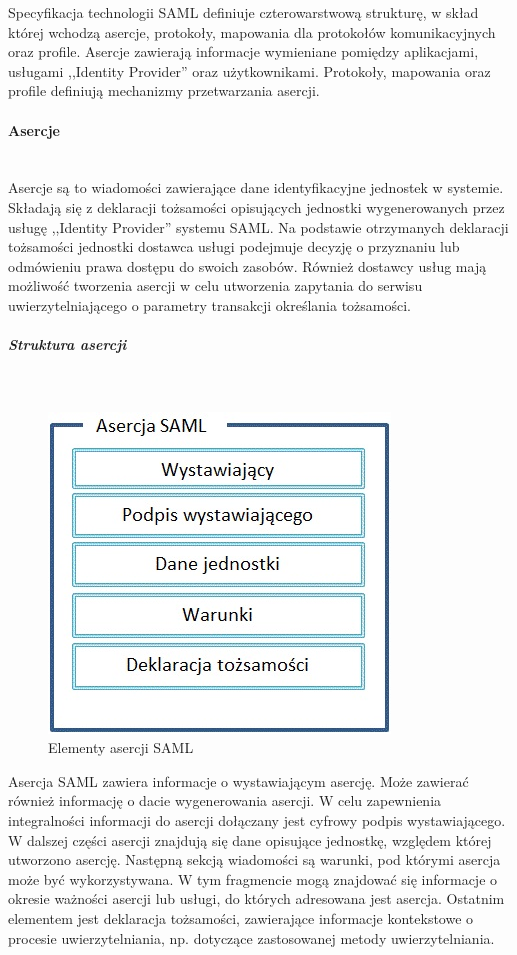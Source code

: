 		Specyfikacja technologii SAML definiuje czterowarstwową strukturę, w skład której wchodzą asercje, protokoły, mapowania dla protokołów komunikacyjnych oraz profile. 
		Asercje zawierają informacje wymieniane pomiędzy aplikacjami, usługami ,,Identity Provider'' oraz użytkownikami. Protokoły, mapowania oraz profile definiują mechanizmy przetwarzania asercji.

		\paragraph{Asercje}\mbox{}\\
					
			Asercje są to wiadomości zawierające dane identyfikacyjne jednostek w systemie. Składają się z deklaracji tożsamości opisujących jednostki wygenerowanych przez usługę ,,Identity Provider'' systemu SAML. Na podstawie otrzymanych deklaracji tożsamości jednostki dostawca usługi podejmuje decyzję o przyznaniu lub odmówieniu prawa dostępu do swoich zasobów. Również dostawcy usług mają możliwość tworzenia asercji w celu utworzenia zapytania do serwisu uwierzytelniającego o parametry transakcji określania tożsamości. 

			\subparagraph{Struktura asercji}\mbox{}\\
			
				\begin{figure}[h]
				\centering
					\includegraphics{img/samlAssertion.jpg}
				\caption{Elementy asercji SAML}
				\label{Elementy asercji SAML}
				\end{figure}

				Asercja SAML zawiera informacje o wystawiającym asercję. Może zawierać również informację o dacie wygenerowania asercji. W celu zapewnienia integralności informacji do asercji dołączany jest cyfrowy podpis wystawiającego. W dalszej części asercji znajdują się dane opisujące jednostkę, względem której utworzono asercję. Następną sekcją wiadomości są warunki, pod którymi asercja może być wykorzystywana. W tym fragmencie mogą znajdować się informacje o okresie ważności asercji lub usługi, do których adresowana jest asercja. Ostatnim elementem jest deklaracja tożsamości, zawierające informacje kontekstowe o procesie uwierzytelniania, np. dotyczące zastosowanej metody uwierzytelniania.

